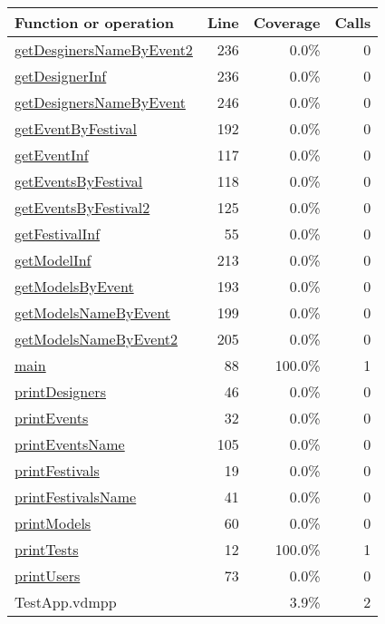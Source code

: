 \begin{longtable}{|l|r|r|r|}
\hline
Function or operation & Line & Coverage & Calls \\
\hline
\hline
\hyperref[getDesginersNameByEvent2:236]{getDesginersNameByEvent2} & 236&0.0\% & 0 \\
\hline
\hyperref[getDesignerInf:236]{getDesignerInf} & 236&0.0\% & 0 \\
\hline
\hyperref[getDesignersNameByEvent:246]{getDesignersNameByEvent} & 246&0.0\% & 0 \\
\hline
\hyperref[getEventByFestival:192]{getEventByFestival} & 192&0.0\% & 0 \\
\hline
\hyperref[getEventInf:117]{getEventInf} & 117&0.0\% & 0 \\
\hline
\hyperref[getEventsByFestival:118]{getEventsByFestival} & 118&0.0\% & 0 \\
\hline
\hyperref[getEventsByFestival2:125]{getEventsByFestival2} & 125&0.0\% & 0 \\
\hline
\hyperref[getFestivalInf:55]{getFestivalInf} & 55&0.0\% & 0 \\
\hline
\hyperref[getModelInf:213]{getModelInf} & 213&0.0\% & 0 \\
\hline
\hyperref[getModelsByEvent:193]{getModelsByEvent} & 193&0.0\% & 0 \\
\hline
\hyperref[getModelsNameByEvent:199]{getModelsNameByEvent} & 199&0.0\% & 0 \\
\hline
\hyperref[getModelsNameByEvent2:205]{getModelsNameByEvent2} & 205&0.0\% & 0 \\
\hline
\hyperref[main:88]{main} & 88&100.0\% & 1 \\
\hline
\hyperref[printDesigners:46]{printDesigners} & 46&0.0\% & 0 \\
\hline
\hyperref[printEvents:32]{printEvents} & 32&0.0\% & 0 \\
\hline
\hyperref[printEventsName:105]{printEventsName} & 105&0.0\% & 0 \\
\hline
\hyperref[printFestivals:19]{printFestivals} & 19&0.0\% & 0 \\
\hline
\hyperref[printFestivalsName:41]{printFestivalsName} & 41&0.0\% & 0 \\
\hline
\hyperref[printModels:60]{printModels} & 60&0.0\% & 0 \\
\hline
\hyperref[printTests:12]{printTests} & 12&100.0\% & 1 \\
\hline
\hyperref[printUsers:73]{printUsers} & 73&0.0\% & 0 \\
\hline
\hline
TestApp.vdmpp & & 3.9\% & 2 \\
\hline
\end{longtable}

